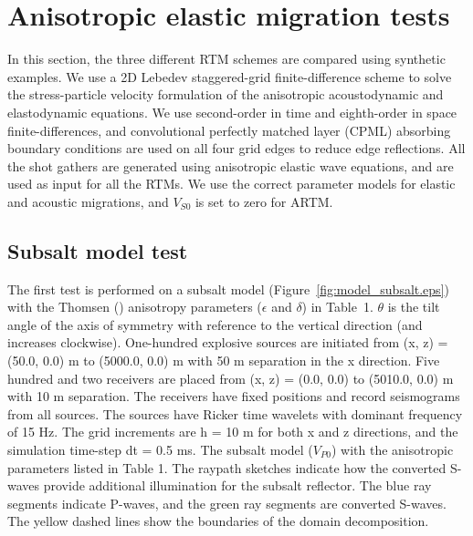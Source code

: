 \documentclass[manuscript,ulem,graphix,revised]{geophysics}
\begin{document}
\section{Anisotropic elastic migration tests}
\indent\indent
In this section, the three different RTM schemes are compared using synthetic examples. We use a 2D Lebedev staggered-grid finite-difference scheme \citep{vadim10} to solve the stress-particle velocity formulation of the anisotropic acoustodynamic and elastodynamic equations. We use second-order in time and eighth-order in space finite-differences, and convolutional perfectly matched layer (CPML) absorbing boundary conditions \citep{komatitsch07} are used on all four grid edges 
to reduce edge reflections. All the shot gathers are generated using anisotropic elastic wave equations, and are used as input for all the RTMs. 
We use the correct parameter models for elastic and acoustic migrations, and $V_{S0}$ is set to zero for ARTM. 

\subsection{Subsalt model test}
\indent\indent
The first test is performed on a subsalt model (Figure~\ref{fig:model_subsalt.eps}) with the Thomsen (\citeyear{thomsen86}) anisotropy parameters ($\epsilon$ and $\delta$) in Table~1. $\theta$ is the tilt angle of the axis of symmetry with reference to the vertical direction (and increases clockwise).
One-hundred explosive sources are initiated from (x, z) = (50.0, 0.0) m to  (5000.0, 0.0) m with 50 m separation in the x direction. Five hundred and two receivers are placed from (x, z) = (0.0, 0.0) to (5010.0, 0.0) m with 10 m separation. The receivers have fixed positions and record seismograms from all sources. The sources have Ricker time wavelets with dominant frequency of 15 Hz. 
The grid increments are h = 10 m for both x and z directions, and the simulation time-step dt = 0.5 ms. 
{
The subsalt model ($V_{P0}$) with the anisotropic parameters listed in Table 1. The raypath sketches indicate how the converted S-waves provide additional illumination for the subsalt reflector. The blue ray segments indicate P-waves, and the green ray segments are converted S-waves. The yellow dashed lines show the boundaries of the domain decomposition. 
}

\end{document}
